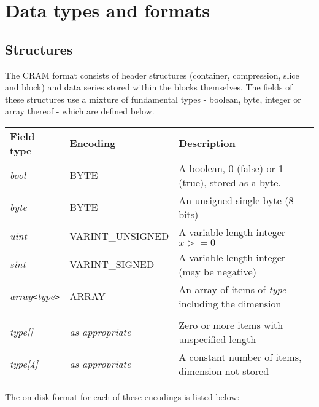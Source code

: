 \documentclass[a4paper]{article}
\begin{document}
\section{Data types and formats}
\subsection*{Structures}

The CRAM format consists of header structures (container, compression, slice and block) and data series stored within the blocks themselves.
The fields of these structures use a mixture of fundamental types - boolean, byte, integer or array thereof - which are defined below.


\begin{tabular}{lll}
\textbf{Field type}  & \textbf{Encoding} & \textbf{Description}\\
\textit{bool}  & BYTE & A boolean, 0 (false) or 1 (true), stored as a byte. \\
\textit{byte}  & BYTE & An unsigned single byte (8 bits)  \\
\textit{uint}  & VARINT\_UNSIGNED & A variable length integer $x >= 0$\\
\textit{sint}  & VARINT\_SIGNED   & A variable length integer (may be negative)\\
\textit{array\texttt{<}type\texttt{>}} & ARRAY & An array of items of \textit{type} including the dimension\\
\\
\textit{type[]}  & \textit{as appropriate} & Zero or more items with unspecified length\\
\textit{type[4]} & \textit{as appropriate} & A constant number of items, dimension not stored\\
\end{tabular}
\vskip 10pt

The on-disk format for each of these encodings is listed below:
\end{document}

